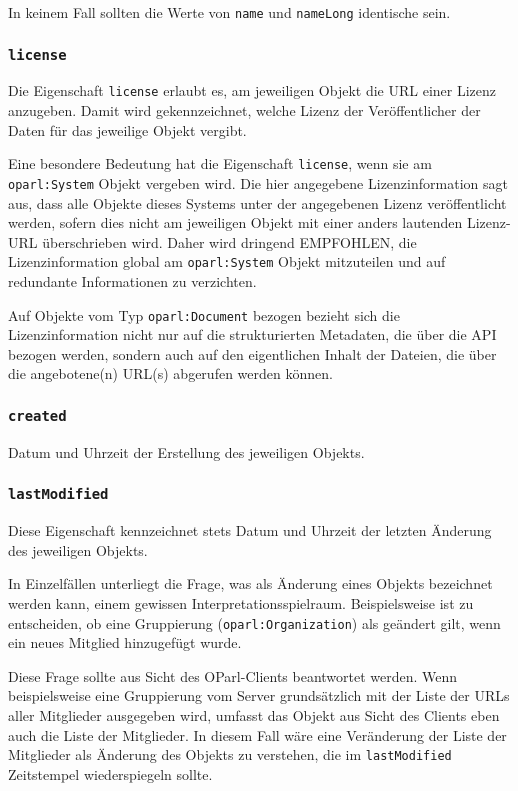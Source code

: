 \documentclass[,a4paper]{article}
\begin{document}
In keinem Fall sollten die Werte von \texttt{name} und \texttt{nameLong}
identische sein.

\subsubsection{\texttt{license}}\label{license}

Die Eigenschaft \texttt{license} erlaubt es, am jeweiligen Objekt die
URL einer Lizenz anzugeben. Damit wird gekennzeichnet, welche Lizenz der
Veröffentlicher der Daten für das jeweilige Objekt vergibt.

Eine besondere Bedeutung hat die Eigenschaft \texttt{license}, wenn sie
am \texttt{oparl:System} Objekt vergeben wird. Die hier angegebene
Lizenzinformation sagt aus, dass alle Objekte dieses Systems unter der
angegebenen Lizenz veröffentlicht werden, sofern dies nicht am
jeweiligen Objekt mit einer anders lautenden Lizenz-URL überschrieben
wird. Daher wird dringend EMPFOHLEN, die Lizenzinformation global am
\texttt{oparl:System} Objekt mitzuteilen und auf redundante
Informationen zu verzichten.

Auf Objekte vom Typ \texttt{oparl:Document} bezogen bezieht sich die
Lizenzinformation nicht nur auf die strukturierten Metadaten, die über
die API bezogen werden, sondern auch auf den eigentlichen Inhalt der
Dateien, die über die angebotene(n) URL(s) abgerufen werden können.

\subsubsection{\texttt{created}}\label{created}

Datum und Uhrzeit der Erstellung des jeweiligen Objekts.

\subsubsection{\texttt{lastModified}}\label{lastmodified}

Diese Eigenschaft kennzeichnet stets Datum und Uhrzeit der letzten
Änderung des jeweiligen Objekts.

In Einzelfällen unterliegt die Frage, was als Änderung eines Objekts
bezeichnet werden kann, einem gewissen Interpretationsspielraum.
Beispielsweise ist zu entscheiden, ob eine Gruppierung
(\texttt{oparl:Organization}) als geändert gilt, wenn ein neues Mitglied
hinzugefügt wurde.

Diese Frage sollte aus Sicht des OParl-Clients beantwortet werden. Wenn
beispielsweise eine Gruppierung vom Server grundsätzlich mit der Liste
der URLs aller Mitglieder ausgegeben wird, umfasst das Objekt aus Sicht
des Clients eben auch die Liste der Mitglieder. In diesem Fall wäre eine
Veränderung der Liste der Mitglieder als Änderung des Objekts zu
verstehen, die im \texttt{lastModified} Zeitstempel wiederspiegeln
sollte.
\end{document}
